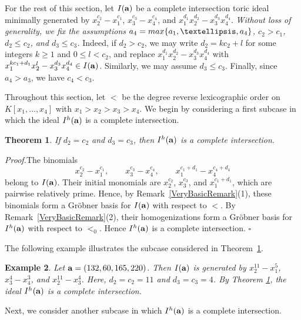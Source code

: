 \documentclass[10pt,a4paper]{amsart}
\newtheorem{thm1}{Theorem}[section]
\newtheorem{ex1}[thm1]{Example}
\begin{document}
 For the rest of this section, let $I({\bf a})$ be a complete intersection toric ideal minimally generated by $x_{2}^{c_2}-x_{1}^{c_1}$, $x_{3}^{c_3}-x_{4}^{c_4}$, and $x_{1}^{d_1}x_{2}^{d_2}-x_{3}^{d_3}x_{4}^{d_4}$. {\em Without loss of generality, we fix the assumptions $a_{4}={\rm max}\{a_1,\ldots,a_4\}$, $c_2>c_1$, $d_2 \leq c_2$, and $d_3 \leq c_3$.} Indeed, if $d_2>c_2$, we may write $d_{2}=kc_2+l$ for some integers $k \geq 1$ and $0 \leq l<c_2$, and replace $x_{1}^{d_1}x_{2}^{d_2}-x_{3}^{d_3}x_{4}^{d_4}$ with $x_{1}^{kc_1+d_1}x_{2}^{l}-x_{3}^{d_3}x_{4}^{d_4} \in I({\bf a})$. Similarly, we may assume $d_3 \leq c_3$. Finally, since $a_4>a_3$, we have $c_4<c_3$.

Throughout this section, let $<$ be the degree reverse lexicographic order on $K[x_1, \ldots, x_4]$ with $x_1 > x_2 > x_3 > x_4$. We begin by considering a first subcase in which the ideal $I^{h}({\bf a})$ is a complete intersection. \vspace{-0.25\baselineskip}

\begin{thm1} \label{BAS1} If $d_2=c_2$ and $d_3=c_3$, then $I^{h}({\bf a})$ is a complete intersection.
\end{thm1}
\vspace{-0.25\baselineskip}
{\em \noindent Proof.}The binomials
\[
x_2^{c_2}-x_1^{c_1},\qquad
x_3^{c_3}-x_4^{c_4},\qquad
x_1^{c_1+d_1}-x_4^{c_4+d_4}
\]
belong to $I({\bf a})$.
Their initial monomials are
$x_2^{c_2}$,
$x_3^{c_3}$,
and
$x_1^{c_1+d_1}$,
which are pairwise relatively prime.
Hence, by Remark~\ref{VeryBasicRemark}(1), these binomials form a
Gr\"obner basis for $I({\bf a})$ with respect to $<$.
By Remark~\ref{VeryBasicRemark}(2), their homogenizations form a
Gr\"obner basis for $I^h({\bf a})$ with respect to $<_0$.
Hence $I^h({\bf a})$ is a complete intersection.
\hfill $\square$ \par\vspace{0.5\baselineskip}

The following example illustrates the subcase considered in Theorem~\ref{BAS1}.

\begin{ex1} {\rm Let ${\bf a}=(132, 60, 165, 220)$. Then $I({\bf a})$ is generated by $x_{2}^{11}-x_{1}^{5}$, $x_3^{4}-x_{4}^{3}$, and $x_{2}^{11}-x_{3}^{4}$. Here, $d_{2}=c_2=11$ and $d_{3}=c_3=4$. By Theorem \ref{BAS1}, the ideal $I^{h}({\bf a})$ is a complete intersection.}
\end{ex1}

Next, we consider another subcase in which $I^{h}({\bf a})$ is a complete intersection.
\end{document}
